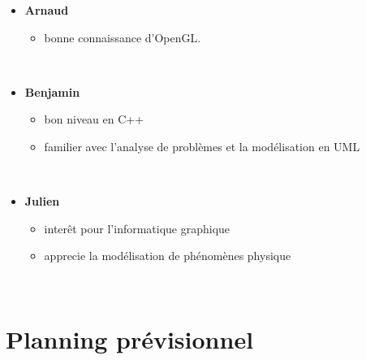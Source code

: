 \documentclass[a4paper,10pt]{article}
\begin{document}
\begin{itemize}

\item \textbf{Arnaud}
\begin{itemize}
\item bonne connaissance d'OpenGL.
\end{itemize}
\quad \\

\item \textbf{Benjamin}
\begin{itemize}
\item bon niveau en C++
\item familier avec l'analyse de problèmes et la modélisation en UML
\end{itemize}
\quad \\

\item \textbf{Julien}
\begin{itemize}
\item interêt pour l'informatique graphique
\item apprecie la modélisation de phénomènes physique
\end{itemize}
\quad \\

\end{itemize}

\section{Planning prévisionnel}
\end{document}
